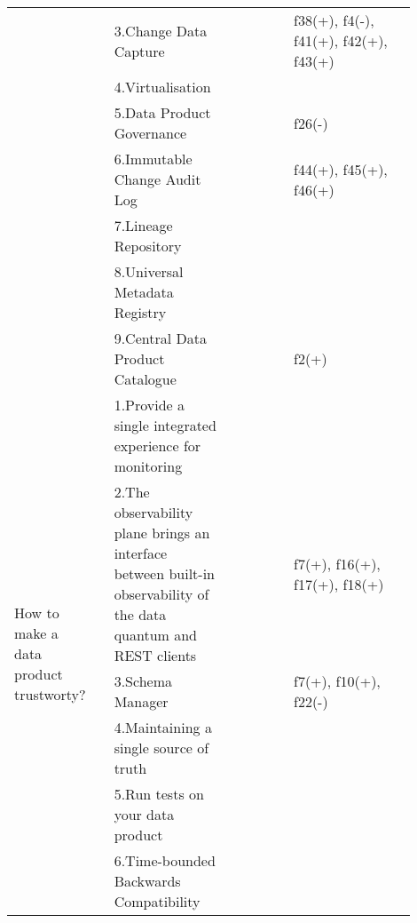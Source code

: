 \begin{tabular}{|p{0.12\linewidth}|p{0.015\linewidth}|p{0.3\linewidth}|p{0.15\linewidth}|p{0.31\linewidth}|}
 & \cellcolor{emerald_shape_7}{} & 3.Change Data Capture&\cellcolor{emerald_shape_3}{s4, s20, s38, s45, s48, s53, s54} & f38(+), f4(-), f41(+), f42(+), f43(+)\\
 & \cellcolor{emerald_shape_7}{} & 4.Virtualisation&\cellcolor{emerald_shape_4}{s4, s14, s15, s18, s19, s20, s46, s49} & \\
 & \cellcolor{emerald_shape_7}{} & 5.Data Product Governance&\cellcolor{emerald_shape_3}{s4, s7, s16, s28, s47} & f26(-)\\
 & \cellcolor{emerald_shape_7}{} & 6.Immutable Change Audit Log&\cellcolor{emerald_shape_4}{s4, s10, s12, s31, s32, s35, s36, s45, s47, s48, s53, s54} & f44(+), f45(+), f46(+)\\
 & \cellcolor{emerald_shape_7}{} & 7.Lineage Repository&\cellcolor{emerald_shape_3}{s5, s7, s9, s15, s48} & \\
 & \cellcolor{emerald_shape_7}{} & 8.Universal Metadata Registry&\cellcolor{emerald_shape_3}{s5, s9, s20, s31, s32, s46} & \\
 & \multirow{-9}{\linewidth}{ \cellcolor{emerald_shape_7}{39}} &9.Central Data Product Catalogue&\cellcolor{emerald_shape_4}{s9, s15, s23, s32, s39, s40, s42, s45, s47, s48, s53, s54} & f2(+)\\
\multirow{6}{\linewidth}{How to make a data product trustworty?} &\cellcolor{emerald_shape_6}{} &1.Provide a single integrated experience for monitoring&\cellcolor{emerald_shape_6}{s1, s3, s4, s5, s6, s9, s10, s11, s12, s19, s20, s22, s28, s32, s33, s35, s36} & \\
 & \cellcolor{emerald_shape_6}{} & 2.The observability plane brings an interface between built-in observability of the data quantum and REST clients&\cellcolor{emerald_shape_3}{s3, s7, s11, s13, s22, s52} & f7(+), f16(+), f17(+), f18(+)\\
 & \cellcolor{emerald_shape_6}{} & 3.Schema Manager&\cellcolor{emerald_shape_5}{s3, s6, s7, s10, s15, s16, s17, s19, s20, s24, s41, s47, s48, s54} & f7(+), f10(+), f22(-)\\
 & \cellcolor{emerald_shape_6}{} & 4.Maintaining a single source of truth&\cellcolor{emerald_shape_2}{s25, s29} & \\
 & \cellcolor{emerald_shape_6}{} & 5.Run tests on your data product&\cellcolor{emerald_shape_1}{s28} & \\
 & \multirow{-6}{\linewidth}{ \cellcolor{emerald_shape_6}{34}} &6.Time-bounded Backwards Compatibility&\cellcolor{emerald_shape_4}{s5, s8, s10, s17, s45, s50, s51} & \\

\end{tabular}
